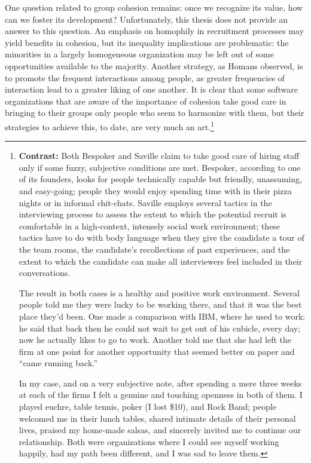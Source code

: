 One question related to group cohesion remains: once we recognize its value, how can we foster its development? Unfortunately, this thesis does not provide an answer to this question. An emphasis on homophily in recruitment processes may yield benefits in cohesion, but its inequality implications are problematic: the minorities in a largely homogeneous organization may be left out of some opportunities available to the majority. Another strategy, as Homans  observed, is to promote the frequent interactions among people, as greater frequencies of interaction lead to a greater liking of one another. It is clear that some software organizations that are aware of the importance of cohesion take good care in bringing to their groups only people who seem to harmonize with them, but their strategies to achieve this, to date, are very much an art.\footnote{\textbf{Contrast:} Both Bespoker and Saville claim to take good care of hiring staff only if some fuzzy, subjective conditions are met. Bespoker, according to one of its founders, looks for people technically capable but friendly, unassuming, and easy-going; people they would enjoy spending time with in their pizza nights or in informal chit-chats. Saville employs several tactics in the interviewing process to assess the extent to which the potential recruit is comfortable in a high-context, intensely social work environment; these tactics have to do with body language when they give the candidate a tour of the team rooms, the candidate's recollections of past experiences, and the extent to which the candidate can make all interviewers feel included in their conversations.
\par The result in both cases is a healthy and positive work environment. Several people told me they were lucky to be working there, and that it was the best place they'd been. One made a comparison with IBM, where he used to work: he said that back then he could not wait to get out of his cubicle, every day; now he actually likes to go to work. Another told me that she had left the firm at one point for another opportunity that seemed better on paper and ``came running back.''
\par In my case, and on a very subjective note, after spending a mere three weeks at each of the firms I felt a genuine and touching openness in both of them. I played euchre, table tennis, poker (I lost \$10), and Rock Band; people welcomed me in their lunch tables, shared intimate details of their personal lives, praised my home-made salsas, and sincerely invited me to continue our relationship. Both were organizations where I could see myself working happily, had my path been different, and I was sad to leave them.}
